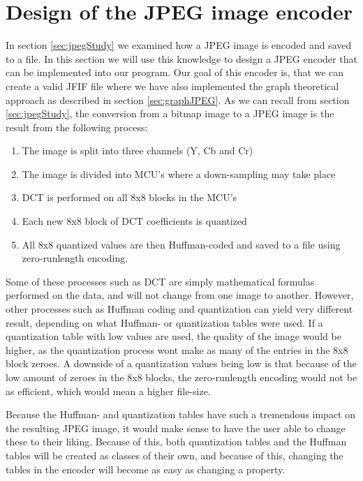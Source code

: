 \section{Design of the JPEG image encoder}
In section \ref{sec:jpegStudy} we examined how a JPEG image is encoded and saved to a file. 
In this section we will use this knowledge to design a JPEG encoder that can be implemented into our program. 
Our goal of this encoder is, that we can create a valid JFIF file where we have also implemented the graph theoretical approach as described in section \ref{sec:graphJPEG}. 
As we can recall from section \ref{sec:jpegStudy}, the conversion from a bitmap image to a JPEG image is the result from the following process:

\begin{enumerate}
	\item The image is split into three channels (Y, Cb and Cr)
	\item The image is divided into MCU's where a down-sampling may take place
	\item DCT is performed on all 8x8 blocks in the MCU's
	\item Each new 8x8 block of DCT coefficients is quantized
	\item All 8x8 quantized values are then Huffman-coded and saved to a file using zero-runlength encoding.
\end{enumerate}

Some of these processes such as DCT are simply mathematical formulas performed on the data, and will not change from one image to another. However, other processes such as Huffman coding and quantization can yield very different result, depending on what Huffman- or quantization tables were used. 
If a quantization table with low values are used, the quality of the image would be higher, as the quantization process wont make as many of the entries in the 8x8 block zeroes. 
A downside of a quantization values being low is that because of the low amount of zeroes in the 8x8 blocks, the zero-runlength encoding would not be as efficient, which would mean a higher file-size. 

Because the Huffman- and quantization tables have such a tremendous impact on the resulting JPEG image, it would make sense to have the user able to change these to their liking. 
Because of this, both quantization tables and the Huffman tables will be created as classes of their own, and because of this, changing the tables in the encoder will become as easy as changing a property.


